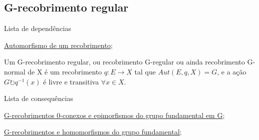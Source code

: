 \subsection{G-recobrimento regular}
\label{g-recobrimento-regular-def}
\begin{titlemize}{Lista de dependências}
	\item \hyperref[automorfismo-de-recobrimento-def]{Automorfismo de um recobrimento};
\end{titlemize}
\begin{defi}
	Um G-recobrimento regular, ou recobrimento G-regular ou ainda recobrimento G-normal de X é um recobrimento $q:E \longrightarrow X$ tal que $Aut(E, q, X) = G$, e a ação $G \circlearrowright q^{-1}(x)$ é livre e transitiva $\forall x \in X$.
\end{defi}

\begin{titlemize}{Lista de consequências}
	\item \hyperref[g-recobrimentos-e-epimorfismos-prop]{G-recobrimentos 0-conexos e epimorfismos do grupo fundamental em G};\\
    	\item \hyperref[homomorfismos-e-g-recobrimentos-prop]{G-recobrimentos e homomorfismos do grupo fundamental};
\end{titlemize}
